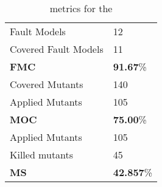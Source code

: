 
\begin{table}[H]

\begin{tabular}{|l|l|}
\hline
Fault Models & 12 \\
Covered Fault Models & 11 \\
\hline
\textbf{FMC} & \textbf{91.67}\% \\
\hline
Covered Mutants & 140 \\
Applied Mutants & 105 \\
\hline
\textbf{MOC} & \textbf{75.00}\% \\
\hline
Applied Mutants & 105 \\
Killed mutants & 45 \\
\hline
\textbf{MS} & \textbf{42.857}\% \\
\hline
\end{tabular}
\caption{\DAMA metrics for the \case}
\label{tab:metrics}
\end{table}
